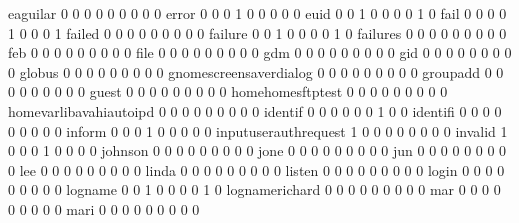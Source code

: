 \documentclass[compress,8pt]{beamer}
\begin{document}
\begin{frame}
\begin{Schunk}
  eaguilar                                   0   0   0   0   0   0   0   0   0
  error                                      0   0   0   1   0   0   0   0   0
  euid                                       0   0   1   0   0   0   0   1   0
  fail                                       0   0   0   0   1   0   0   0   1
  failed                                     0   0   0   0   0   0   0   0   0
  failure                                    0   0   1   0   0   0   0   1   0
  failures                                   0   0   0   0   0   0   0   0   0
  feb                                        0   0   0   0   0   0   0   0   0
  file                                       0   0   0   0   0   0   0   0   0
  gdm                                        0   0   0   0   0   0   0   0   0
  gid                                        0   0   0   0   0   0   0   0   0
  globus                                     0   0   0   0   0   0   0   0   0
  gnomescreensaverdialog                     0   0   0   0   0   0   0   0   0
  groupadd                                   0   0   0   0   0   0   0   0   0
  guest                                      0   0   0   0   0   0   0   0   0
  homehomesftptest                           0   0   0   0   0   0   0   0   0
  homevarlibavahiautoipd                     0   0   0   0   0   0   0   0   0
  identif                                    0   0   0   0   0   0   1   0   0
  identifi                                   0   0   0   0   0   0   0   0   0
  inform                                     0   0   0   1   0   0   0   0   0
  inputuserauthrequest                       1   0   0   0   0   0   0   0   0
  invalid                                    1   0   0   0   1   0   0   0   0
  johnson                                    0   0   0   0   0   0   0   0   0
  jone                                       0   0   0   0   0   0   0   0   0
  jun                                        0   0   0   0   0   0   0   0   0
  lee                                        0   0   0   0   0   0   0   0   0
  linda                                      0   0   0   0   0   0   0   0   0
  listen                                     0   0   0   0   0   0   0   0   0
  login                                      0   0   0   0   0   0   0   0   0
  logname                                    0   0   1   0   0   0   0   1   0
  lognamerichard                             0   0   0   0   0   0   0   0   0
  mar                                        0   0   0   0   0   0   0   0   0
  mari                                       0   0   0   0   0   0   0   0   0

\end{Schunk}
\end{frame}
\end{document}
